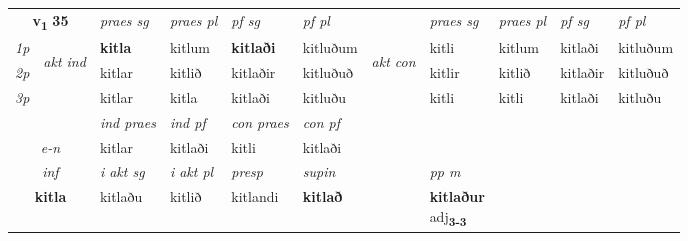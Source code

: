 \noindent
\begin{tabular}{lllllllllll} \toprule
\multicolumn{2}{c}{\textbf{v{\textsubscript{1}}} \Large{\textbf{35}}}  &  \textit{praes sg}  & \textit{praes pl}  &\textit{ pf sg} & \textit{pf pl} &  &  \textit{praes sg}  & \textit{praes pl}  & \textit{pf sg} & \textit{pf pl } \\*
	\cmidrule{3-6} \cmidrule{8-11}
 {\textit{1p}} & \multirow{3}{*}{\begin{turn}{90}\textit{akt ind}\end{turn}} & \textbf{kitla} & kitlum & \textbf{kitlaði} & kitluðum & \multirow{3}{*}{\begin{turn}{90}\textit{akt con}\end{turn}} &kitli & kitlum & kitlaði & kitluðum\\*
 {\textit{2p}} &  &  kitlar  & kitlið & kitlaðir & kitluðuð & & kitlir & kitlið & kitlaðir & kitluðuð \\*
{\textit{3p}} &  & kitlar & kitla & kitlaði & kitluðu & & kitli & kitli& kitlaði & kitluðu \\*
\cmidrule{3-6} \cmidrule{8-11}

   & &  \textit{ind praes} & \textit{ind pf} & \textit{con praes} & \textit{con pf} \\*
\multicolumn{2}{c}{ \textit{e-n} } & kitlar & kitlaði & kitli & kitlaði \\*

\cmidrule{3-8}
   \multicolumn{2}{c}{\textit{inf}}  & \textit{i akt sg} & \textit{i akt pl}   & \textit{presp} & \textit{supin}  && \textit{pp m} \\*
  \multicolumn{2}{c}{\textbf{kitla}} & kitlaðu  & kitlið   & kitlandi &  \textbf{kitlað}  && \specialcell{\textbf{kitlaður} \\ adj\textbf{\textsubscript{3-3}}} \\*
\end{tabular}

